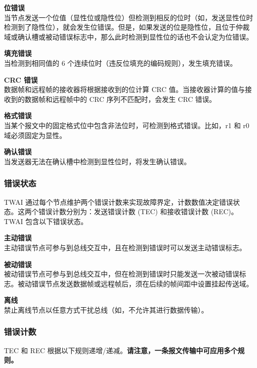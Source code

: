 \documentclass[main\_\_CN.tex]{subfiles}
\begin{document}
{\bfseries 位错误}\\
当节点发送一个位值（显性位或隐性位）但检测到相反的位时（如，发送显性位时检测到了隐性位），就会发生位错误。但是，如果发送的位是隐性位，且位于仲裁域或确认槽或被动错误标志中，那么此时检测到显性位的话也不会认定为位错误。

{\bfseries 填充错误}\\
当检测到相同值的 6 个连续位时（违反位填充的编码规则），发生填充错误。

{\bfseries CRC 错误}\\
数据帧和远程帧的接收器将根据接收到的位计算 CRC 值。当接收器计算的值与接收到的数据帧和远程帧中的 CRC 序列不匹配时，会发生 CRC 错误。

{\bfseries 格式错误}\\
当某个报文中的固定格式位中包含非法位时，可检测到格式错误。比如，r1 和 r0 域必须固定为显性。

{\bfseries 确认错误}\\
当发送器无法在确认槽中检测到显性位时，将发生确认错误。

\subsubsection{错误状态}
TWAI 通过每个节点维护两个错误计数来实现故障界定，计数数值决定错误状态。这两个错误计数分别为：发送错误计数 (TEC) 和接收错误计数 (REC)。TWAI 包含以下错误状态。

{\bfseries 主动错误}\\
主动错误节点可参与到总线交互中，且在检测到错误时可以发送主动错误标志。

{\bfseries 被动错误}\\
被动错误节点可参与到总线交互中，但在检测到错误时只能发送一次被动错误标志。被动错误节点发送数据帧或远程帧后，须在后续的帧间距中设置挂起传送域。

{\bfseries 离线}\\
禁止离线节点以任意方式干扰总线（如，不允许其进行数据传输）。

\subsubsection{错误计数}

TEC 和 REC 根据以下规则递增/递减。\textbf{请注意，一条报文传输中可应用多个规则。}
\end{document}
